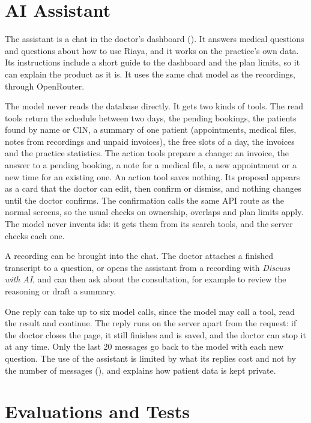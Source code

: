 \section{AI Assistant}\label{sec:assistant}

The assistant is a chat in the doctor's dashboard (). It answers medical questions and questions about how to use Riaya, and it works on the practice's own data. Its instructions include a short guide to the dashboard and the plan limits, so it can explain the product as it is. It uses the same chat model as the recordings, through OpenRouter.

The model never reads the database directly. It gets two kinds of tools. The read tools return the schedule between two days, the pending bookings, the patients found by name or CIN, a summary of one patient (appointments, medical files, notes from recordings and unpaid invoices), the free slots of a day, the invoices and the practice statistics. The action tools prepare a change: an invoice, the answer to a pending booking, a note for a medical file, a new appointment or a new time for an existing one. An action tool saves nothing. Its proposal appears as a card that the doctor can edit, then confirm or dismiss, and nothing changes until the doctor confirms. The confirmation calls the same API route as the normal screens, so the usual checks on ownership, overlaps and plan limits apply. The model never invents ids: it gets them from its search tools, and the server checks each one.

A recording can be brought into the chat. The doctor attaches a finished transcript to a question, or opens the assistant from a recording with \textit{Discuss with AI}, and can then ask about the consultation, for example to review the reasoning or draft a summary.

One reply can take up to six model calls, since the model may call a tool, read the result and continue. The reply runs on the server apart from the request: if the doctor closes the page, it still finishes and is saved, and the doctor can stop it at any time. Only the last 20 messages go back to the model with each new question. The use of the assistant is limited by what its replies cost and not by the number of messages (), and  explains how patient data is kept private.

\section{Evaluations and Tests}\label{sec:evaluations}

